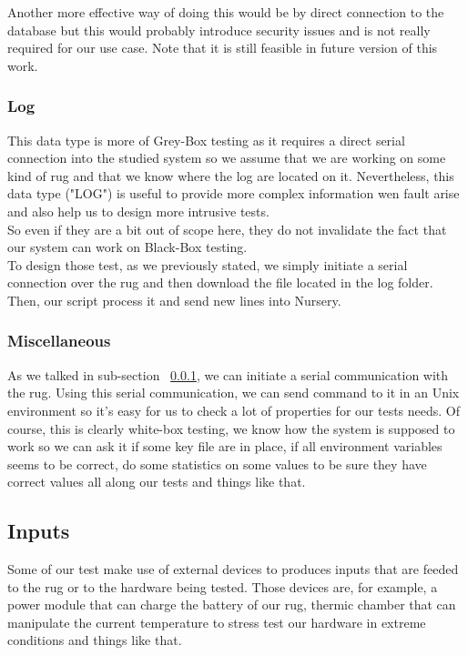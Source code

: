 \documentclass[12pt]{article}
\theoremstyle{definition}
\theoremstyle{definition}
\theoremstyle{remark}
\begin{document}
Another more effective way of doing this would be by direct connection to the database but this would probably introduce security issues and is not really required for our use case. Note that it is still feasible in future version of this work.

\subsubsection{Log}
\label{subsec:log}

This data type is more of Grey-Box testing as it requires a direct serial connection into the studied system so we assume that we  are working on some kind of \gls{rug} and that we know where the log are located on it. Nevertheless, this data type ("LOG") is useful to provide more complex information wen fault arise and also help us to design more intrusive tests.\\

So even if they are a bit out of scope here, they do not invalidate the fact that our system can work on Black-Box testing.\\

To design those test, as we previously stated, we simply initiate a serial connection over the \gls{rug} and then download the file located in the log folder. Then, our script process it and send new lines into Nursery.

\subsubsection{Miscellaneous}
\label{subsec:misc}

As we talked in sub-section ~\ref{subsec:log}, we can initiate a serial communication with the \gls{rug}. Using this serial communication, we can send command to it in an Unix environment so it's easy for us to check a lot of properties for our tests needs. Of course, this is clearly white-box testing, we know how the system is supposed to work so we can ask it if some key file are in place, if all environment variables seems to be correct, do some statistics on some values to be sure they have correct values all along our tests and things like that.\\

\subsection{Inputs}

Some of our test make use of external devices to produces inputs that are feeded to the \gls{rug} or to the hardware being tested. Those devices are, for example, a power module that can charge the battery of our \gls{rug}, thermic chamber that can manipulate the current temperature to stress test our hardware in extreme conditions and things like that.\\
\end{document}
